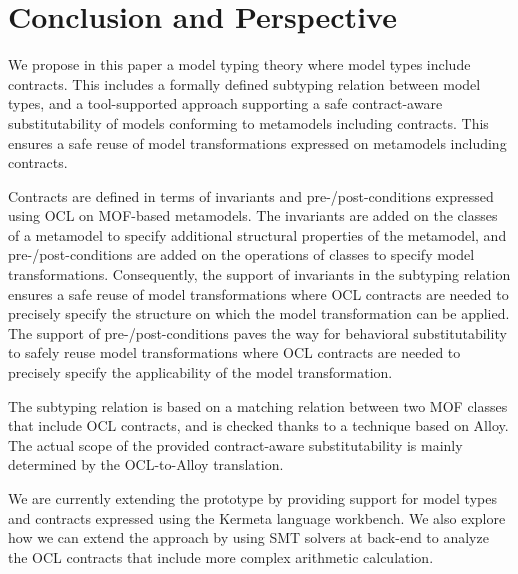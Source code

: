 \section{Conclusion and Perspective}\label{conclusion}

We propose in this paper a model typing theory where model types include contracts. 
This includes a formally defined subtyping relation between model types, and a tool-supported approach supporting a safe contract-aware substitutability of models conforming to metamodels including contracts. This ensures a safe reuse of model transformations expressed on metamodels including contracts.

Contracts are defined in terms of invariants and pre-/post-conditions expressed using OCL on MOF-based metamodels. 
The invariants are added on the classes of a metamodel to specify additional structural properties of the metamodel, and pre-/post-conditions are added on the operations of classes to specify model transformations. 
%
Consequently, the support of invariants in the subtyping relation ensures a safe reuse of model transformations where OCL contracts are needed to precisely specify the structure on which the model transformation can be applied. The support of pre-/post-conditions paves the way for behavioral substitutability to safely reuse model transformations where OCL contracts are needed to precisely specify the applicability of the model transformation.

The subtyping relation is based on a matching relation between two MOF classes that include OCL contracts, and is checked thanks to a technique based on Alloy. The actual scope of the provided contract-aware substitutability is mainly determined by the OCL-to-Alloy translation.

%
We are currently extending the prototype by providing support for model types and contracts expressed using the Kermeta language workbench.  We also explore how we can extend the approach by using SMT solvers at back-end to analyze the OCL contracts that include more complex arithmetic calculation.